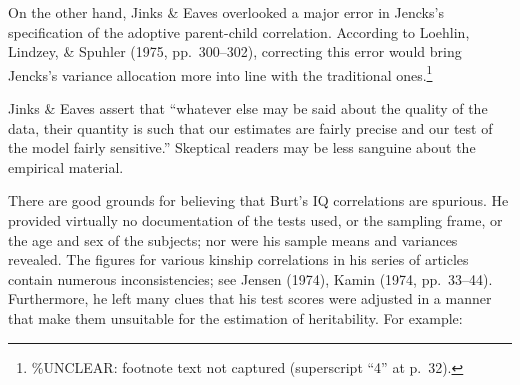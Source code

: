 ﻿\documentclass[12pt]{article}
\begin{document}
On the other hand, Jinks \& Eaves overlooked a major error in Jencks's specification of the adoptive parent-child correlation. According to Loehlin, Lindzey, \& Spuhler (1975, pp.\ 300--302), correcting this error would bring Jencks's variance allocation more into line with the traditional ones.\footnote{\%UNCLEAR: footnote text not captured (superscript ``4'' at p.\ 32).}

Jinks \& Eaves assert that ``whatever else may be said about the quality of the data, their quantity is such that our estimates are fairly precise and our test of the model fairly sensitive.'' Skeptical readers may be less sanguine about the empirical material.

There are good grounds for believing that Burt's IQ correlations are spurious. He provided virtually no documentation of the tests used, or the sampling frame, or the age and sex of the subjects; nor were his sample means and variances revealed. The figures for various kinship correlations in his series of articles contain numerous inconsistencies; see Jensen (1974), Kamin (1974, pp.\ 33--44). Furthermore, he left many clues that his test scores were adjusted in a manner that make them unsuitable for the estimation of heritability. For example:
\end{document}
